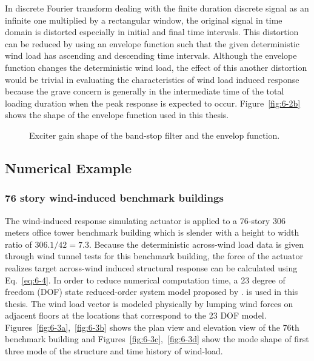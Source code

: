 In discrete Fourier transform dealing with the finite duration discrete signal as an infinite one multiplied by a rectangular window, the original signal in time domain is distorted especially in initial and final time intervals. This distortion can be reduced by using an envelope function such that the given deterministic wind load has ascending and descending time intervals. Although the envelope function changes the deterministic wind load, the effect of this another distortion would be trivial in evaluating the characteristics of wind load induced response because the grave concern is generally in the intermediate time of the total loading duration when the peak response is expected to occur. Figure~\ref{fig:6-2b} shows the shape of the envelope function used in this thesis.

\begin{figure}[!ht]
\centering
{}
\caption{Exciter gain shape of the band-stop filter and the envelop function.}
\label{fig:6-2}
\end{figure}

\subsection{Numerical Example}
\subsubsection{76 story wind-induced benchmark buildings}

The wind-induced response simulating actuator is applied to a 76-story 306 meters office tower benchmark building which is slender with a height to width ratio of $306.1/42= 7.3$. Because the deterministic across-wind load data is given through wind tunnel tests for this benchmark building, the force of the actuator realizes target across-wind induced structural response can be calculated using Eq.~\eqref{eq:6-4}. In order to reduce numerical computation time, a 23 degree of freedom (DOF) state reduced-order system model proposed by \citet{yang2004benchmark}. is used in this thesis. The wind load vector is modeled physically by lumping wind forces on adjacent floors at the locations that correspond to the 23 DOF model. Figures~\ref{fig:6-3a},~\ref{fig:6-3b} shows the plan view and elevation view of the 76th benchmark building and Figures~\ref{fig:6-3c},~\ref{fig:6-3d} show the mode shape of first three mode of the structure and time history of wind-load.

